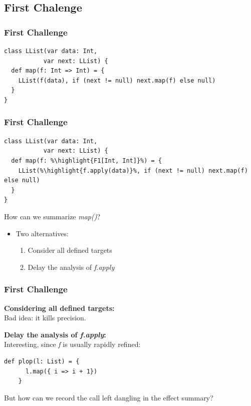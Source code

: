 \documentclass[hyperref={pdfpagelabels=false}]{beamer}
\newcommand\highlight[1]{\color{red}{#1}}
\begin{document}
\subsection{First Chalenge}

\begin{frame}[fragile]
\frametitle{First Challenge}
\begin{lstlisting}
class LList(var data: Int,
           var next: LList) {
  def map(f: Int => Int) = {
    LList(f(data), if (next != null) next.map(f) else null)
  }
}
\end{lstlisting}
\end{frame}

\begin{frame}[fragile]
\frametitle{First Challenge}
\begin{lstlisting}[escapechar=\%]
class LList(var data: Int,
           var next: LList) {
  def map(f: %\highlight{F1[Int, Int]}%) = {
    LList(%\highlight{f.apply(data)}%, if (next != null) next.map(f) else null)
  }
}
\end{lstlisting}

    \vspace{10pt}
    How can we summarize \emph{map()}?

    \pause
    \begin{itemize}
        \item Two alternatives:
        \begin{enumerate}
            \item Consider all defined targets
            \item Delay the analysis of \emph{f.apply}
        \end{enumerate}
    \end{itemize}
\end{frame}

\begin{frame}[fragile]
\frametitle{First Challenge}
    \textbf{Considering all defined targets:}\\
    \vspace{5pt}
    Bad idea: it kills precision.

    \vspace{25pt}
    \pause

    \textbf{Delay the analysis of \emph{f.apply}:}\\
    \vspace{5pt}
    Interesting, since \emph{f} is usually rapidly refined:

\begin{lstlisting}[escapechar=\%]
    def plop(l: List) = {
      l.map({ i => i + 1})
    }
\end{lstlisting}

 But how can we record the call left dangling in the effect summary?
\end{frame}
\end{document}
